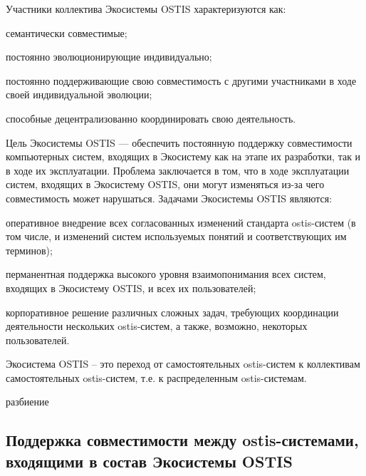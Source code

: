 Участники коллектива Экосистемы OSTIS характеризуются как:
\begin{textitemize}
    \item семантически совместимые;
    \item постоянно эволюционирующие индивидуально;
    \item постоянно поддерживающие свою совместимость с другими участниками в ходе своей индивидуальной эволюции;
    \item способные децентрализованно координировать свою деятельность.
\end{textitemize}

Цель Экосистемы OSTIS --- обеспечить постоянную поддержку совместимости компьютерных систем, входящих в Экосистему как на этапе их разработки, так и в ходе их эксплуатации. 
Проблема заключается в том, что в ходе эксплуатации систем, входящих в Экосистему OSTIS, они могут изменяться из-за чего совместимость может нарушаться. 
Задачами Экосистемы OSTIS являются:
\begin{textitemize}
    \item оперативное внедрение всех согласованных изменений стандарта ostis-систем (в том числе, и изменений систем используемых понятий и соответствующих им терминов);
    \item перманентная поддержка высокого уровня взаимопонимания всех систем, входящих в Экосистему OSTIS, и всех их пользователей;
    \item корпоративное решение различных сложных задач, требующих координации деятельности нескольких ostis-систем, а также, возможно, некоторых пользователей.
\end{textitemize}

Экосистема OSTIS – это переход от самостоятельных ostis-систем к коллективам самостоятельных ostis-систем, т.е. к распределенным ostis-системам.

\begin{SCn}
\begin{scnrelfromset}{разбиение}
\end{scnrelfromset}
\end{SCn}


\subsection{Поддержка совместимости между ostis-системами, входящими в состав Экосистемы OSTIS}
{\label{sec_ecosystem_interoperability_support}} 

